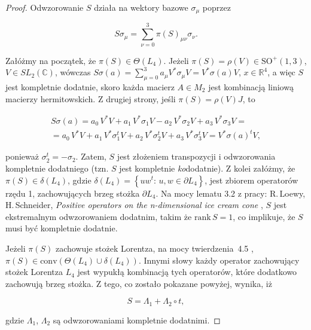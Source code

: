 \begin{proof}
\label{RandomLabel:875919}
  Odwzorowanie $S$ działa na wektory bazowe $\sigma_{\mu}$ poprzez
\begin{linenomath*}
 \begin{equation}
 S \sigma_{\mu} = \sum_{\nu = 0}^{3} \pi(S)_{\mu \nu} \sigma_{\nu}.
 \end{equation}
\end{linenomath*}
Załóżmy na początek, że $\pi(S) \in \Theta(L_{4})$.
Jeżeli $\pi(S) = \rho(V) \in \text{SO}^{+}(1,3)$,
$V \in SL_{2}(\mathbb{C})$,
wówczas
$S \sigma(a) = \sum_{\mu = 0}^{3}  a_{\mu} V^{*} \sigma_{\mu} V =
 V^{*} \sigma(a) V$,
 $x \in \mathbb{R}^{4}$,
a więc $S$ jest kompletnie dodatnie,
skoro każda macierz $A \in M_{2}$ jest kombinacją liniową macierzy hermitowskich.
Z drugiej strony,
jeśli $\pi(S) = \rho(V) J$,
to
\begin{linenomath*}
 \begin{multline}
\label{RandomLabel:830200}
S \sigma(a) =
  a_{0} \, V^{*}V + a_{1} \, V^{*} \sigma_{1} V -
  a_{2} \, V^{*} \sigma_{2} V +
  a_{3} \, V^{*} \sigma_{3} V = \\
  = a_{0} \, V^{*}V + a_{1} \, V^{*} \sigma_{1}^{t} V +
  a_{2} \, V^{*} \sigma_{2}^{t} V +
  a_{3} \, V^{*} \sigma_{3}^{t} V =
  V^{*} \sigma(a)^{t} V,
 \end{multline}
\end{linenomath*}
ponieważ $\sigma_{2}^{t} = - \sigma_{2}$.
Zatem, $S$ jest złożeniem transpozycji i odwzorowania kompletnie dodatniego
(tzn. $S$  jest kompletnie \emph{ko}dodatnie).
Z kolei załóżmy, że $\pi(S) \in \delta(L_{4})$,
gdzie
$
 \delta(L_{4}) = \left \{ u w^{t}:
 \, u, w \in \partial L_{4}  \right \}
$,
jest zbiorem operatorów rzędu 1, zachowujących brzeg stożka $\partial L_{4}$.
Na mocy  lematu 3.2 z pracy:
R.\,Loewy, H.\,Schneider,
\emph{Positive operators on the n-dimensional ice cream cone}
\cite{loewy1975positive},
$S$ jest ekstremalnym odwzorowaniem dodatnim, takim że $\text{rank}\,S = 1$,
co implikuje, że $S$ musi być kompletnie dodatnie.

Jeżeli $\pi(S)$ zachowuje stożek Lorentza,
na mocy \mbox{twierdzenia 4.5} \cite{loewy1975positive},
$\pi(S) \in \text{conv} \left ( \Theta(L_{4}) \cup \delta(L_{4}) \right)$.
Innymi słowy każdy operator zachowujący stożek Lorentza $L_{4}$
jest wypukłą kombinacją tych operatorów, które dodatkowo zachowują brzeg stożka.
Z tego, co zostało pokazane powyżej, wynika, iż
\begin{linenomath*}
 \begin{equation}
\label{RandomLabel:587827}
    S = \Lambda_{1} + \Lambda_{2} \circ t,
 \end{equation}
\end{linenomath*}
gdzie $\Lambda_{1}$, $\Lambda_{2}$
są odwzorowaniami kompletnie dodatnimi.
\end{proof}

